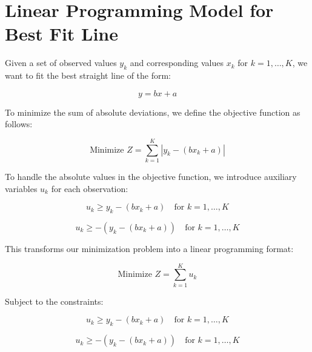 \documentclass{article}
\begin{document}
\section*{Linear Programming Model for Best Fit Line}

Given a set of observed values \( y_k \) and corresponding values \( x_k \) for \( k = 1, \ldots, K \), we want to fit the best straight line of the form:

\[
y = bx + a
\]

To minimize the sum of absolute deviations, we define the objective function as follows:

\[
\text{Minimize } Z = \sum_{k=1}^{K} |y_k - (bx_k + a)|
\]

To handle the absolute values in the objective function, we introduce auxiliary variables \( u_k \) for each observation:

\[
u_k \geq y_k - (bx_k + a) \quad \text{for } k = 1, \ldots, K
\]

\[
u_k \geq -(y_k - (bx_k + a)) \quad \text{for } k = 1, \ldots, K
\]

This transforms our minimization problem into a linear programming format:

\[
\text{Minimize } Z = \sum_{k=1}^{K} u_k
\]

Subject to the constraints:

\[
u_k \geq y_k - (bx_k + a) \quad \text{for } k = 1, \ldots, K
\]

\[
u_k \geq -(y_k - (bx_k + a)) \quad \text{for } k = 1, \ldots, K
\]
\end{document}
